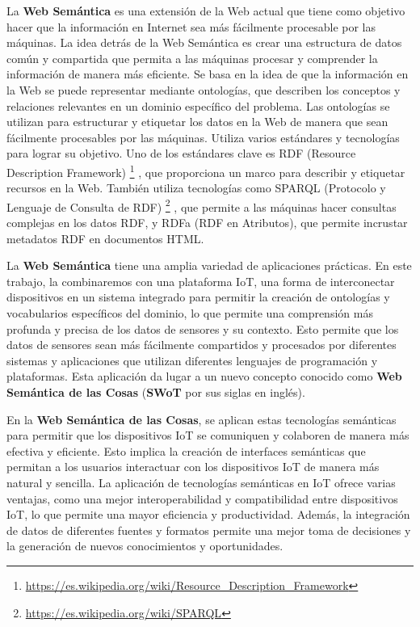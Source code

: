\documentclass[12pt]{article}
\begin{document}
La \textbf{Web Semántica} es una extensión de la Web actual que tiene como objetivo hacer que la información en Internet sea más fácilmente procesable por las máquinas. La idea detrás de la Web Semántica es crear una estructura de datos común y compartida que permita a las máquinas procesar y comprender la información de manera más eficiente. Se basa en la idea de que la información en la Web se puede representar mediante ontologías, que describen los conceptos y relaciones relevantes en un dominio específico del problema. Las ontologías se utilizan para estructurar y etiquetar los datos en la Web de manera que sean fácilmente procesables por las máquinas. Utiliza varios estándares y tecnologías para lograr su objetivo. Uno de los estándares clave es RDF (Resource Description Framework) \footnote{\href{{https://es.wikipedia.org/wiki/Resource_Description_Framework}}{\url{https://es.wikipedia.org/wiki/Resource_Description_Framework}}} , que proporciona un marco para describir y etiquetar recursos en la Web. También utiliza tecnologías como SPARQL (Protocolo y Lenguaje de Consulta de RDF) \footnote{\href{{https://es.wikipedia.org/wiki/SPARQL}}{\url{https://es.wikipedia.org/wiki/SPARQL}}} , que permite a las máquinas hacer consultas complejas en los datos RDF, y RDFa (RDF en Atributos), que permite incrustar metadatos RDF en documentos HTML.

La \textbf{Web Semántica} tiene una amplia variedad de aplicaciones prácticas. En este trabajo, la combinaremos con una plataforma IoT, una forma de interconectar dispositivos en un sistema integrado para permitir la creación de ontologías y vocabularios específicos del dominio, lo que permite una comprensión más profunda y precisa de los datos de sensores y su contexto. Esto permite que los datos de sensores sean más fácilmente compartidos y procesados por diferentes sistemas y aplicaciones que utilizan diferentes lenguajes de programación y plataformas. Esta aplicación da lugar a un nuevo concepto conocido como \textbf{Web Semántica de las Cosas} (\textbf{SWoT} por sus siglas en inglés).

En la \textbf{Web Semántica de las Cosas}, se aplican estas tecnologías semánticas para permitir que los dispositivos IoT se comuniquen y colaboren de manera más efectiva y eficiente. Esto implica la creación de interfaces semánticas que permitan a los usuarios interactuar con los dispositivos IoT de manera más natural y sencilla. La aplicación de tecnologías semánticas en IoT ofrece varias ventajas, como una mejor interoperabilidad y compatibilidad entre dispositivos IoT, lo que permite una mayor eficiencia y productividad. Además, la integración de datos de diferentes fuentes y formatos permite una mejor toma de decisiones y la generación de nuevos conocimientos y oportunidades.
\end{document}
